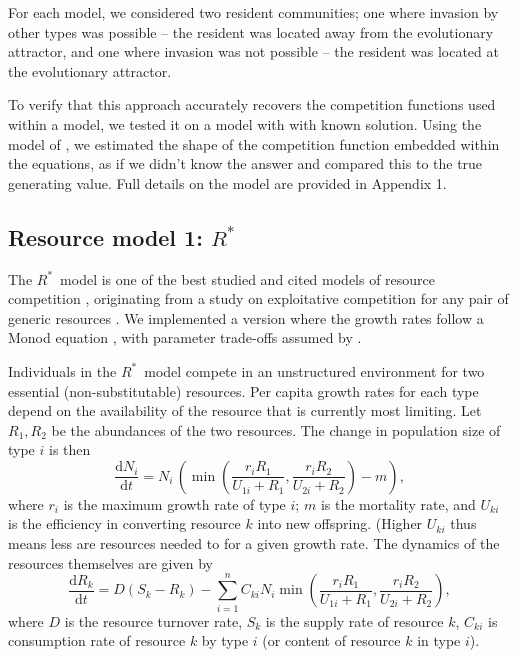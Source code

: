\documentclass[a4paper,11pt]{article}
\newcommand{\ud}{\ensuremath{\mathrm{d}}}
\newcommand{\Rstar}{\ensuremath{R^*}}
\begin{document}
For each model, we considered two resident communities; one where
invasion by other types was possible -- the resident was located away from the evolutionary attractor, and one where invasion was not
possible -- the resident was located at the evolutionary attractor.

To verify that this approach accurately recovers the competition functions used within a model, we tested it on a model with with known solution. Using the model of \citet{Dieckmann-1999}, we estimated the shape of the competition function embedded within the equations, as if we didn't know the answer and compared this to the true generating value. Full details on the model are provided in Appendix 1.

\subsection{Resource model 1: \Rstar }

The \Rstar\ model is one of the best studied and cited models of
resource competition \citep{Tilman-1977, Tilman-1982, Huisman-2001},
originating from a study on exploitative competition for any pair of
generic resources \citep{Leon-1975}. We implemented a version where
the growth rates follow a Monod equation \citep{Huisman-2001}, with
parameter trade-offs assumed by \citet{Fox-2008}.

Individuals in the \Rstar\ model compete in an unstructured environment for two essential (non-substitutable) resources. Per capita growth rates for each type depend on the availability of the resource that is currently most limiting. Let $R_1, R_2$ be the abundances of the two resources. The change in population size of type $i$ is then
\begin{equation}
  \label{eq:rstar-n}
  \frac{\ud N_i}{\ud t} = N_i \, \left(\min\left(\frac{r_i R_1}{U_{1i} + R_1}, \frac{r_i R_2}{U_{2i} + R_2}\right) - m\right),
\end{equation}
where $r_i$ is the maximum growth rate of type $i$; $m$ is the mortality rate, and $U_{ki}$ is the efficiency in converting resource $k$ into new offspring. (Higher $U_{ki}$ thus means less are resources needed to for a given growth rate. The dynamics of the resources themselves are given by
\begin{equation}
  \label{eq:rstar-r}
  \frac{\ud R_k}{\ud t} =
  D (S_k - R_k) - \sum_{i=1}^n {C_{ki} N_i
    \min\left(\frac{r_i R_1}{U_{1i} + R_1}, \frac{r_i R_2}{U_{2i} + R_2}\right)},
\end{equation}
where $D$ is the resource turnover rate, $S_k$ is the supply rate of
resource $k$, $C_{ki}$ is consumption rate of resource $k$ by type $i$
(or content of resource $k$ in type $i$).
\end{document}
